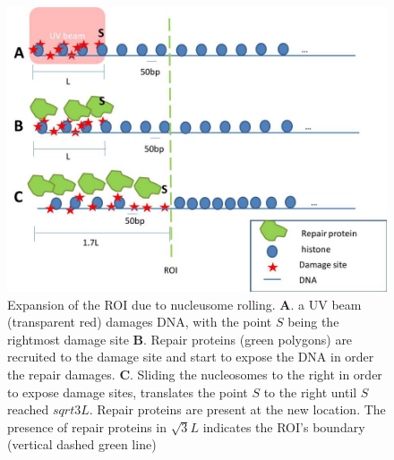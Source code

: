 \documentclass[12pt]{paper}
\begin{document}
	
	\begin{figure}
	\centering
	\includegraphics[width=0.7\linewidth]{histoneSlidingMulti}
	\caption{Expansion of the ROI due to nucleusome rolling. \textbf{A}. a UV beam (transparent red) damages DNA, with the point $S$ being the rightmost damage site \textbf{B}. Repair proteins (green polygons) are recruited to the damage site and start to expose the DNA in order the repair damages. \textbf{C}. Sliding the nucleosomes to the right in order to expose damage sites, translates the point $S$ to the right until $S$ reached $sqrt{3}L$. Repair proteins are present at the new location. The presence of repair proteins in $\sqrt{3}L$ indicates the ROI's boundary (vertical dashed green line)}
	\label{fig:histoneSlidingMulti}
	\end{figure}
\end{document}
